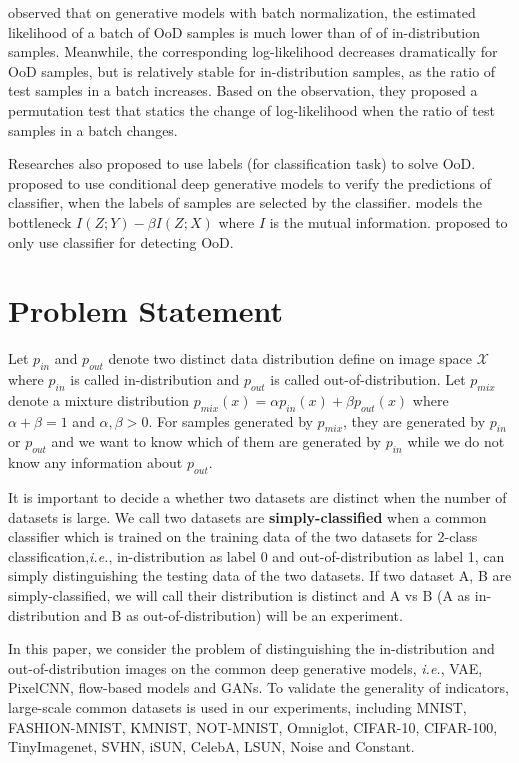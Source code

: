 \documentclass[letterpaper]{article} %
\newcommand{\IE}{\textit{i.e.}, }
\newcommand{\pin}{p_{in}}
\newcommand{\pout}{p_{out}}
\newcommand{\pmix}{p_{mix}}
\begin{document}
\cite{song2019unsupervised} observed that on generative models with batch normalization, the estimated likelihood of a batch of OoD samples is much lower than of of in-distribution samples. Meanwhile, the corresponding log-likelihood decreases dramatically for OoD samples, but is relatively stable for in-distribution samples, as the ratio of test samples in a batch increases. Based on the observation, they proposed a permutation test that statics the change of log-likelihood when the ratio of test samples in a batch changes. 

Researches also proposed to use labels (for classification task) to solve OoD. 
\cite{che2019deep} proposed to use conditional deep generative models to verify the predictions of classifier, when the labels of samples are selected by the classifier. \cite{alemi2018uncertainty} models the bottleneck $I(Z;Y)-\beta I(Z;X)$ where $I$ is the mutual information. 
\cite{hendrycks2016baseline,hendrycks2018deep,hsu2020generalized,lee2018simple} proposed to only use classifier for detecting OoD. 

\section{Problem Statement}\label{sec2}

Let $\pin$ and $\pout$ denote two distinct data distribution define on image space $\mathcal{X}$ where $\pin$ is called in-distribution and $\pout$ is called out-of-distribution. 
Let $\pmix$ denote a mixture distribution $\pmix(x) = \alpha \pin(x) + \beta \pout(x)$ where $\alpha + \beta = 1$ and $\alpha, \beta > 0$. 
For samples generated by $\pmix$, they are generated by $\pin$ or $\pout$ and we want to know which of them are generated by $\pin$ while we do not know any information about $\pout$. 

It is important to decide a whether two datasets are distinct when the number of datasets is large. We call two datasets are \textbf{simply-classified} when a common classifier which is trained on the training data of the two datasets for 2-class classification,\IE in-distribution as label 0 and out-of-distribution as label 1, can simply distinguishing the testing data of the two datasets. If two dataset A, B are simply-classified, we will call their distribution is distinct and A vs B (A as in-distribution and B as out-of-distribution) will be an experiment. 

In this paper, we consider the problem of distinguishing the in-distribution and out-of-distribution images on the common deep generative models, \IE VAE, PixelCNN, flow-based models and GANs. To validate the generality of indicators, large-scale common datasets is used in our experiments, including MNIST, FASHION-MNIST, KMNIST, NOT-MNIST, Omniglot, CIFAR-10, CIFAR-100, TinyImagenet, SVHN, iSUN, CelebA, LSUN, Noise and Constant. 
\end{document}
